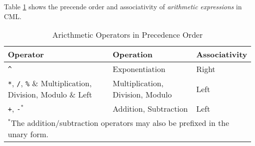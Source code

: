 Table \ref{tab:arithmetic-constraints} shows the precende order and associativity of \emph{arithmetic expressions}
in CML.

\begin{table}[H]
\centering
\begin{tabular}
{ l l l }
\hline
Operator & Operation & Associativity \\
\hline
\verb!^! & Exponentiation & Right \\
\verb!*!, \verb!/!, \verb!%! & Multiplication, Division, Modulo & Left  \\
\verb!+!, \verb!-!$^*$ & Addition, Subtraction & Left \\
\multicolumn{3}{l}{\footnotesize{$^*$The addition/subtraction operators
may also be prefixed in the unary form.}}
\end{tabular}
\caption{Aricthmetic Operators in Precedence Order}
\label{tab:arithmetic-constraints}
\end{table}
